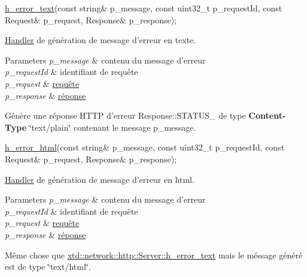 \begin{DoxyItemize}
\item 
\begin{DoxyCode}
\hyperlink{classxtd_1_1network_1_1http_1_1Server_a39656db929894be1af465c0409c22f35}{h\_error\_text}(\textcolor{keyword}{const} \textcolor{keywordtype}{string}& p\_message, \textcolor{keyword}{const} uint32\_t p\_requestId, \textcolor{keyword}{const} Request& p\_request, 
      Response& p\_response); 
\end{DoxyCode}
 \hyperlink{classxtd_1_1network_1_1http_1_1Server_1_1Handler}{Handler} de génération de message d'erreur en texte. 
\begin{DoxyParams}{Parameters}
{\em p\-\_\-message} & contenu du message d'erreur \\
\hline
{\em p\-\_\-request\-Id} & identifiant de requête \\
\hline
{\em p\-\_\-request} & \hyperlink{classxtd_1_1network_1_1http_1_1Request}{requête} \\
\hline
{\em p\-\_\-response} & \hyperlink{classxtd_1_1network_1_1http_1_1Response}{réponse}\\
\hline
\end{DoxyParams}
Génère une réponse H\-T\-T\-P d'erreur Response\-::\-S\-T\-A\-T\-U\-S\-\_ de type {\bfseries Content-\/\-Type} \char`\"{}text/plain\char`\"{} contenant le message p\-\_\-message.
\item 
\begin{DoxyCode}
\hyperlink{classxtd_1_1network_1_1http_1_1Server_ac2b937b63242559f3a2dd45627f31de3}{h\_error\_html}(\textcolor{keyword}{const} \textcolor{keywordtype}{string}& p\_message, \textcolor{keyword}{const} uint32\_t p\_requestId, \textcolor{keyword}{const} Request& p\_request, 
      Response& p\_response); 
\end{DoxyCode}
 \hyperlink{classxtd_1_1network_1_1http_1_1Server_1_1Handler}{Handler} de génération de message d'erreur en html. 
\begin{DoxyParams}{Parameters}
{\em p\-\_\-message} & contenu du message d'erreur \\
\hline
{\em p\-\_\-request\-Id} & identifiant de requête \\
\hline
{\em p\-\_\-request} & \hyperlink{classxtd_1_1network_1_1http_1_1Request}{requête} \\
\hline
{\em p\-\_\-response} & \hyperlink{classxtd_1_1network_1_1http_1_1Response}{réponse}\\
\hline
\end{DoxyParams}
Même chose que \hyperlink{classxtd_1_1network_1_1http_1_1Server_a39656db929894be1af465c0409c22f35}{xtd\-::network\-::http\-::\-Server\-::h\-\_\-error\-\_\-text} mais le méssage généré est de type \char`\"{}text/html\char`\"{}.
\end{DoxyItemize}

